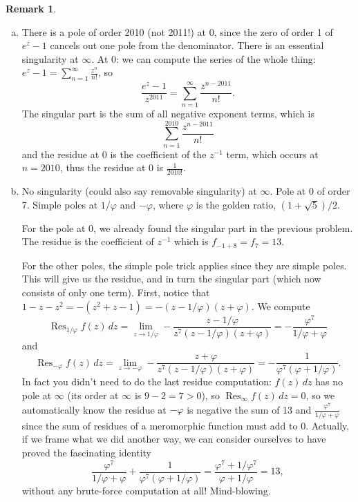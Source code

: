 \documentclass[11pt,oneside]{amsart}
\theoremstyle{definition}
\newtheorem{remark}{Remark}
\DeclareMathOperator{\Res}{Res}
\begin{document}
\begin{remark} %
  \leavevmode\begin{enumerate}[(a)]
    \item There is a pole of order 2010 (not 2011!) at 0, since the zero of order 1 of $e^z-1$ cancels out one pole from the denominator. There is an essential singularity at $\infty$.
    At 0: we can compute the series of the whole thing: $e^z-1=\sum_{n=1}^\infty\frac{z^n}{n!}$, so
    \[\frac{e^z-1}{z^{2011}}=\sum_{n=1}^\infty\frac{z^{n-2011}}{n!}.\]
    The singular part is the sum of all negative exponent terms, which is
    \[\sum_{n=1}^{2010}\frac{z^{n-2011}}{n!}\]
    and the residue at 0 is the coefficient of the $z^{-1}$ term, which occurs at $n=2010$, thus the residue at 0 is $\frac 1{2010!}$.

    \item No singularity (could also say removable singularity) at $\infty$. Pole at 0 of order 7. Simple poles at $1/\varphi$ and $-\varphi$, where $\varphi$ is the golden ratio, $(1+\sqrt 5)/2$.
    
    For the pole at 0, we already found the singular part in the previous problem. The residue is the coefficient of $z^{-1}$ which is $f_{-1+8}=f_7=13$.

    For the other poles, the simple pole trick applies since they are simple poles. This will give us the residue, and in turn the singular part (which now consists of only one term). First, notice that $1-z-z^2=-(z^2+z-1)=-(z-1/\varphi)(z+\varphi)$. We compute
    \[\Res_{1/\varphi} f(z)\,dz=\lim_{z\to1/\varphi}-\frac{z-1/\varphi}{z^7(z-1/\varphi)(z+\varphi)}=-\frac {\varphi^7}{1/\varphi+\varphi}\]
    and
    \[\Res_{-\varphi} f(z)\,dz=\lim_{z\to-\varphi}-\frac{z+\varphi}{z^7(z-1/\varphi)(z+\varphi)}=-\frac 1{\varphi^7(\varphi+1/\varphi)}.\]
    In fact you didn't need to do the last residue computation: $f(z)\,dz$ has no pole at $\infty$ (its order at $\infty$ is $9-2=7>0$), so $\Res_\infty f(z)\,dz=0$, so we automatically know the residue at $-\varphi$ is negative the sum of 13 and $\frac {\varphi^7}{1/\varphi+\varphi}$ since the sum of residues of a meromorphic function must add to 0. Actually, if we frame what we did another way, we can consider ourselves to have proved the fascinating identity
    \[\frac {\varphi^7}{1/\varphi+\varphi}+\frac 1{\varphi^7(\varphi+1/\varphi)}=\frac{\varphi^7+1/\varphi^7}{\varphi+1/\varphi}=13,\]
    without any brute-force computation at all! Mind-blowing.
  \end{enumerate}
\end{remark}
\end{document}
